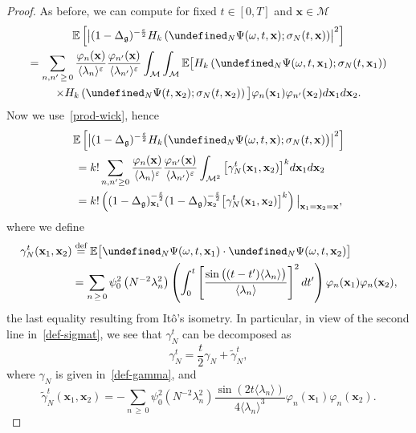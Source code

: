 \documentclass[10pt,a4paper]{article}
\newcommand{\E}{\mathbb{E}}
\newcommand{\deff}{\overset{\textup{def}}{=}}
\let\P= \undefined
\newcommand{\P}{\mathbf{P}}
\newcommand{\x}{\mathbf{x}}
\newcommand{\M}{\mathcal{M}}
\newcommand{\g}{\mathfrak{g}}
\newcommand{\Dlg}{\Delta_{\g}}
\newcommand{\eps}{\varepsilon}
\newcommand{\s}{\sigma}
\renewcommand{\o}{\omega}
\newcommand{\jb}[1] {\langle #1 \rangle}
\begin{document}
\begin{proof}
As before, we can compute for fixed $t\in [0,T]$ and $\x\in\M$
\begin{multline*}
\E\left[\left|(1-\Dlg)^{-\frac\eps2}H_k\left(\P_N\Psi(\o,t,\x);\s_N(t,\x)\right)\right|^2\right]\\
=\sum_{n,n'\,\geq\,0}\frac{\varphi_n(\x)}{\jb{\lambda_n}^{\eps}}\frac{\varphi_{n'}(\x)}{\jb{\lambda_{n'}}^{\eps}}\int_{\M}\int_{\M}\E\big[H_k\left(\P_N\Psi(\o,t,\x_1);\s_N(t,\x_1)\right)\\
\times H_k\left(\P_N\Psi(t,\x_2);\s_N(t,\x_2)\right)\big]\varphi_n(\x_1)\varphi_{n'}(\x_2)d\x_1d\x_2.
\end{multline*}
Now we use~\eqref{prod-wick}, hence
\begin{multline*}
\E\left[\left|(1-\Dlg)^{-\frac\eps2}H_k\big(\P_N\Psi(\o,t,\x);\s_N(t,\x)\big)\right|^2\right]\\
\begin{aligned}
&=k!\sum_{n,n'\geq 0}\frac{\varphi_n(\x)}{\jb{\lambda_n}^{\eps}}\frac{\varphi_{n'}(\x)}{\jb{\lambda_{n'}}^{\eps}}\int_{\M^2}\big[\gamma_N^t(\x_1,\x_2)\big]^kd\x_1d\x_2\\
&=k!\left((1-\Dlg)_{\x_1}^{-\frac\eps2}(1-\Dlg)_{\x_2}^{-\frac\eps2}\big[\gamma_N^t(\x_1,\x_2)\big]^k\right)\big|_{\x_1=\x_2=\x},
\end{aligned}
\end{multline*}
where we define
\begin{align*}
\gamma_N^t(\x_1,\x_2) &\deff  \E\big[\P_N\Psi(\o,t,\x_1)\cdot\P_N\Psi(\o,t,\x_2)\big]\\
&= \sum_{n\,\geq\,0}\psi_0^2\left(N^{-2}\lambda_n^2\right)\left(\int_0^t\left[\frac{\sin\big((t-t')\jb{\lambda_n}\big)}{\jb{\lambda_n}}\right]^2dt'\right)\varphi_n(\x_1)\varphi_n(\x_2),
\end{align*}
the last equality resulting from It\^o's isometry. In particular, in view of the second line in~\eqref{def-sigmat}, we see that $\gamma_N^t$ can be decomposed as
\begin{equation*}
\gamma_N^t = \frac{t}{2}\gamma_N + \widetilde{\gamma}_N^t,
\end{equation*}
where $\gamma_N$ is given in~\eqref{def-gamma}, and
\begin{equation*}
\widetilde{\gamma}_N^t(\x_1,\x_2) = -\sum_{n\,\geq\,0}\psi_0^2\left(N^{-2}\lambda_n^2\right)\frac{\sin\left(2t\jb{\lambda_n}\right)}{4\jb{\lambda_n}^3}\varphi_n(\x_1)\varphi_n(\x_2).
\end{equation*}


\end{proof}
\end{document}
